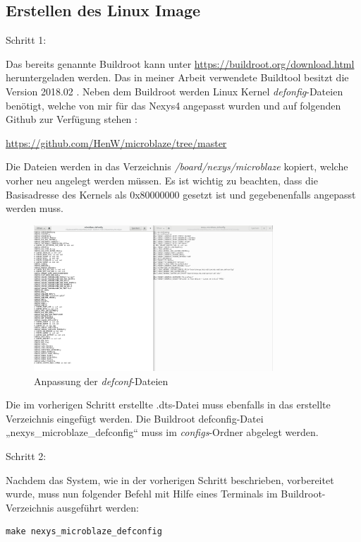 \subsection{Erstellen des Linux Image}\label{kap:microblazelinux}



Schritt 1:

Das bereits genannte Buildroot kann unter \url{https://buildroot.org/download.html} heruntergeladen werden.
Das in meiner Arbeit verwendete Buildtool besitzt die Version 2018.02 .
Neben dem Buildroot werden Linux Kernel \emph{defonfig}-Dateien benötigt, welche von mir für das Nexys4 angepasst wurden und auf folgenden Github zur Verfügung stehen :

\url{https://github.com/HenW/microblaze/tree/master}

Die Dateien werden in das Verzeichnis \emph{/board/nexys/microblaze} kopiert, welche vorher neu angelegt werden müssen. Es ist wichtig zu beachten, dass die Basisadresse des Kernels als 0x80000000 gesetzt ist und gegebenenfalls angepasst werden muss.


\begin{figure}[H]
\centering
\includegraphics[width=0.8\textwidth]{Hauptteil/Schritt16.png}
\caption{Anpassung der \emph{defconf}-Dateien}
\label{fig:mbschritt16}
\end{figure}

Die im vorherigen Schritt erstellte .dts-Datei muss ebenfalls in das erstellte Verzeichnis eingefügt werden.
Die Buildroot defconfig-Datei „nexys\_microblaze\_defconfig“ muss im \emph{configs}-Ordner abgelegt werden.

Schritt 2:

Nachdem das System, wie in der vorherigen Schritt beschrieben,
vorbereitet wurde, muss nun folgender Befehl mit Hilfe eines Terminals im Buildroot-Verzeichnis ausgeführt werden:

\begin{lstlisting}[caption={Generierung der \emph{defconf}-Datei},label={code:mbdefconf}]
  make nexys_microblaze_defconfig
 \end{lstlisting}


